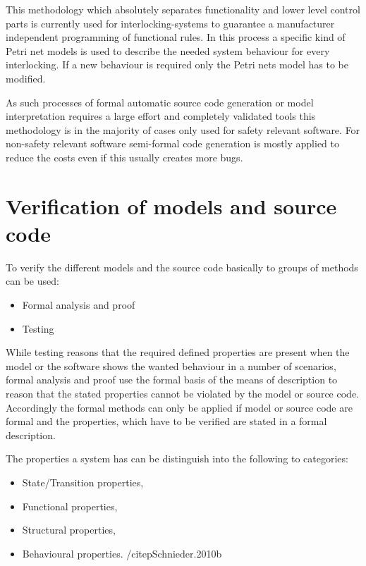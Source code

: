 \documentclass{./template/openetcs_report}
\begin{document}
This methodology which absolutely separates functionality and lower level control parts is currently used for interlocking-systems to guarantee a manufacturer independent programming of functional rules. In this process a specific kind of Petri net models is used to describe the needed system behaviour for every interlocking. If a new behaviour is required only the Petri nets model has to be modified.

As such processes of formal automatic source code generation or model interpretation requires a large effort and completely validated tools this methodology is in the majority of cases only used for safety relevant software.  For non-safety relevant software semi-formal code generation is mostly applied to reduce the costs even if this usually creates more bugs. 

\section{Verification of models and source code}

To verify the different models and the source code basically to groups of methods can be used:
\vspace{-10pt}
\begin{itemize}[topsep=2pt, partopsep=2pt,itemsep=2pt,parsep=2pt]
\item Formal analysis and proof
\item Testing
\end{itemize}

While testing reasons that the required defined properties are present when the model or the software  shows the wanted behaviour in a number of scenarios, formal analysis and proof use the formal basis of the means of description to reason that the stated properties cannot be violated by the model or source code. Accordingly the formal methods can only be applied if  model or source code are formal and the properties, which have to be verified are stated in a formal description. 

The properties a system has can be distinguish into the following to categories:

\vspace{-10pt}
\begin{itemize}[topsep=2pt, partopsep=2pt,itemsep=2pt,parsep=2pt]
\item State/Transition properties,
\item Functional properties,
\item Structural properties,
\item Behavioural properties. /citep{Schnieder.2010b}
\end{itemize}
\end{document}
